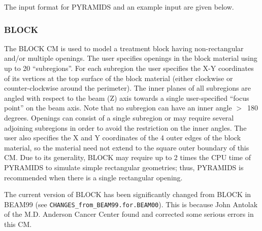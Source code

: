 \documentclass[12pt,twoside]{article}
\begin{document}

\clearpage
The input format for PYRAMIDS and an example input are given below.
\begin{small}

\end{small}


\clearpage


\subsubsection{BLOCK}
\renewcommand{\rightmark}{BLOCK CM}
The BLOCK CM is used to model a treatment block having non-rectangular
and/or multiple openings.  The user specifies openings in the block
material using up to 20 ``subregions''.  For each subregion the user
specifies the X-Y coordinates of its vertices at the top surface of the
block material (either clockwise or counter-clockwise around the
perimeter).  The inner planes of all subregions are angled with respect to
the beam (Z) axis towards a single user-specified ``focus point'' on the
beam axis.  Note that no subregion can have an inner
angle $>$~180 degrees.
Openings can consist of a single subregion or may require
several adjoining subregions in order to avoid the restriction on the inner
angles.
The user also specifies the X and Y coordinates
of the 4 outer edges of the block material, so the material need not
extend to the square outer boundary of this CM.  Due to its generality,
BLOCK may require up to 2 times the CPU time of PYRAMIDS to simulate
simple rectangular geometries; thus, PYRAMIDS is recommended when there is
a single rectangular opening.

The current version of BLOCK has been significantly changed from
BLOCK in BEAM99 (see {\tt CHANGES\_from\_BEAM99.for.BEAM00}).  This
is because John Antolak of the M.D. Anderson Cancer Center found and
corrected some serious errors in this CM.
\end{document}

